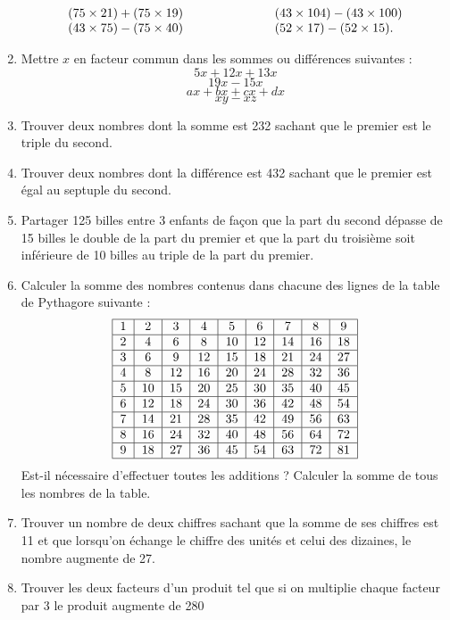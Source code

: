 \documentclass[12 pt]{extarticle}
\theoremstyle{plain}
\begin{document}
\begin{enumerate}
\[\begin{tabular}{lll}
$(75 \times 21) + (75 \times 19)$ &\phantom{meowmeow}& 
$(43 \times 104) - (43 \times 100)$\\
$(43 \times 75) - (75 \times 40)$ &\phantom{meowmeow}& $(52 \times 17) - (52 \times 15)$.
\end{tabular}
\]
\item Mettre $x$ en facteur commun dans les sommes ou différences suivantes : 
\[ 5x + 12x + 13x\]
\[19x - 15x\]
\[ax + bx + cx + dx\]
\[xy - xz\]
\item Trouver deux nombres dont la somme est 232 sachant que le premier est le triple du second.
\item Trouver deux nombres dont la différence est 432
sachant que le premier est égal au septuple du second.
\item Partager 125 billes entre 3 enfants de façon que la part du second dépasse de 15 billes le double de 
la part du premier et que la part du troisième soit inférieure de 10 billes au triple de la part du premier. 
\item Calculer la somme des nombres contenus dans chacune des lignes de la table de Pythagore suivante : 
\[\begin{tabular}{| c | c | c | c | c | c | c | c | c |}
\hline
1 & 2 & 3 & 4 & 5 & 6 & 7 & 8 & 9 \\ \hline
2 & 4 & 6 & 8 & 10 & 12 & 14 & 16 & 18 \\ \hline
3 & 6 & 9 & 12 & 15 & 18 & 21 & 24 & 27 \\ \hline
4 & 8 & 12 & 16 & 20 & 24 & 28 & 32 & 36 \\ \hline
5 & 10 & 15 & 20 & 25 & 30 & 35 & 40 & 45 \\ \hline
6 & 12 & 18 & 24 & 30 & 36 & 42 & 48 & 54 \\ \hline
7 & 14 & 21  & 28 & 35 & 42 & 49 & 56 & 63 \\ \hline
8 & 16 & 24 & 32 & 40 & 48 & 56 & 64 & 72 \\ \hline
9 & 18 & 27 & 36 & 45 & 54 & 63 & 72 & 81 \\ \hline \end{tabular}\]
Est-il nécessaire d'effectuer toutes les additions ? 
Calculer la somme de tous les nombres de la table. 
\item Trouver un nombre de deux chiffres sachant que la somme de ses chiffres est 11 et que lorsqu'on échange le chiffre des unités et celui des dizaines,
le nombre augmente de 27. 
\item Trouver les deux facteurs d'un produit tel que si on multiplie chaque facteur par 3 le produit augmente de 280

\end{enumerate}
\end{document}
